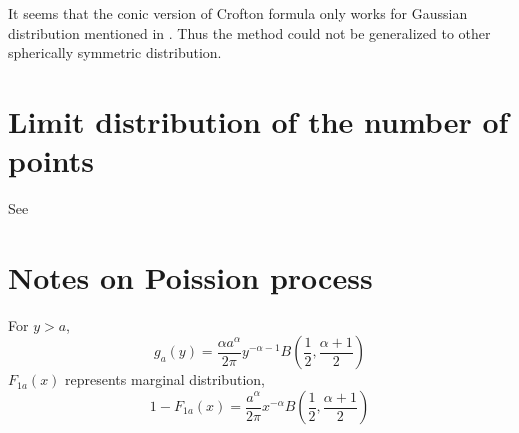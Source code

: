 \documentclass{article}
\begin{document}
It seems that the conic version of Crofton formula only
works for Gaussian distribution mentioned in \cite{kabluchko2020absorption}.
Thus the method could not be generalized to
other spherically symmetric distribution.
\section{Limit distribution of the number of points}
See \cite{aldous1991number}
\section{Notes on Poission process}
For $y>a$,
\begin{equation}
    g_a(y) = \frac{\alpha a^{\alpha}}{2\pi}
    y^{-\alpha-1} B(\frac{1}{2}, \frac{\alpha + 1}{2})
\end{equation}
$F_{1a}(x)$ represents marginal distribution,
\begin{equation}
    1-F_{1a}(x)=\frac{a^{\alpha}}{2\pi}x^{-\alpha}B(\frac{1}{2}, \frac{\alpha + 1}{2})
\end{equation}


\end{document}
